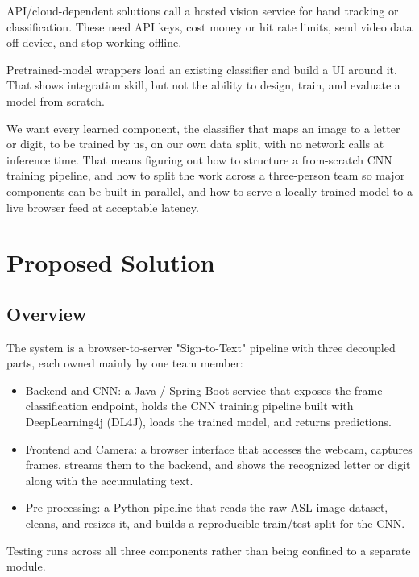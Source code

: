\documentclass[12pt,a4paper]{article}
\begin{document}
API/cloud-dependent solutions call a hosted vision service for hand tracking or
classification. These need API keys, cost money or hit rate limits, send video data
off-device, and stop working offline.

Pretrained-model wrappers load an existing classifier and build a UI around it. That
shows integration skill, but not the ability to design, train, and evaluate a model from
scratch.

We want every learned component, the classifier that maps an image to a letter or digit, to
be trained by us, on our own data split, with no network calls at inference time. That means
figuring out how to structure a from-scratch CNN training pipeline, and how to split the work
across a three-person team so major components can be built in parallel, and how to serve a
locally trained model to a live browser feed at acceptable latency.


\section{Proposed Solution}

\subsection{Overview}

The system is a browser-to-server "Sign-to-Text" pipeline with three decoupled parts, each
owned mainly by one team member:

\begin{itemize}[leftmargin=*]

  \item Backend and CNN: a Java / Spring Boot service that exposes the frame-classification
  endpoint, holds the CNN training pipeline built with DeepLearning4j (DL4J), loads the
  trained model, and returns predictions.

  \item Frontend and Camera: a browser interface that accesses the webcam, captures frames,
  streams them to the backend, and shows the recognized letter or digit along with the
  accumulating text.

  \item Pre-processing: a Python pipeline that reads the raw ASL image dataset, cleans, and
  resizes it, and builds a reproducible train/test split for the CNN.

\end{itemize}

Testing runs across all three components rather than being confined to a separate module.
\end{document}
